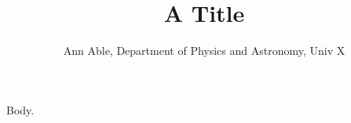 \documentclass{article}
\begin{document}
\title{A Title}
\author{Ann Able, Department of Physics and Astronomy, Univ X}
\maketitle
Body.
\end{document}
